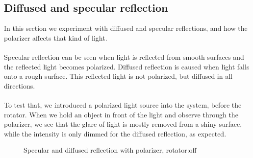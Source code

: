\documentclass[english]{article}
\begin{document}
\subsection{Diffused and specular reflection}
In this section we experiment with diffused and specular reflections, and how the polarizer affects that kind of light.\\
\\
Specular reflection can be seen when light is reflected from smooth surfaces and the reflected light becomes polarized.
Diffused reflection is caused when light falls onto a rough surface. 
This reflected light is not polarized, but diffused in all directions.\\
\\
To test that, we introduced a polarized light source into the system, before the rotator.
When we hold an object in front of the light and observe through the polarizer, we see that the glare of light is mostly removed from a shiny surface, while the intensity is only dimmed for the diffused reflection, as expected.\\

\begin{figure}[H]
	\centering
	\caption{Specular and diffused reflection with polarizer, rotator:off}
	\label{fig:eight}
\end{figure}
\end{document}
